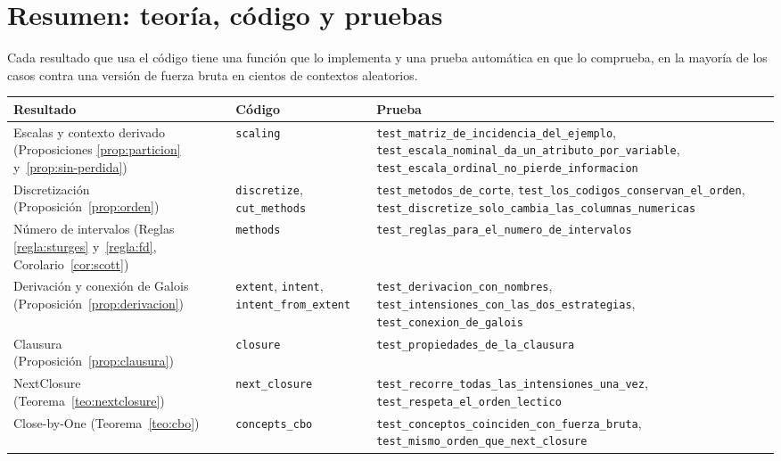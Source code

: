 \section{Resumen: teoría, código y pruebas}
\label{sec:resumen-general}

Cada resultado que usa el código tiene una función que lo implementa y una prueba automática en  que lo comprueba, en la mayoría de los casos contra una versión de fuerza bruta en cientos de contextos aleatorios.

\begingroup
\footnotesize
\begin{longtable}{@{}>{\raggedright\arraybackslash}p{4.2cm} >{\raggedright\arraybackslash}p{3.4cm} >{\raggedright\arraybackslash}p{8.1cm}@{}}
  \toprule
  Resultado & Código & Prueba \\
  \midrule
  \endhead
  Escalas y contexto derivado (Proposiciones \ref{prop:particion} y~\ref{prop:sin-perdida}) & \texttt{scaling} & \texttt{test\_matriz\_de\_incidencia\_del\_ejemplo}, \texttt{test\_escala\_nominal\_da\_un\_\allowbreak atributo\_por\_variable}, \texttt{test\_escala\_ordinal\_no\_pierde\_informacion} \\
  Discretización (Proposición~\ref{prop:orden}) & \texttt{discretize}, \texttt{cut\_methods} & \texttt{test\_metodos\_de\_corte}, \texttt{test\_los\_codigos\_conservan\_el\_orden}, \texttt{test\_discretize\_solo\_cambia\_\allowbreak las\_columnas\_numericas} \\
  Número de intervalos (Reglas \ref{regla:sturges} y~\ref{regla:fd}, Corolario~\ref{cor:scott}) & \texttt{methods} & \texttt{test\_reglas\_para\_el\_numero\_de\_intervalos} \\
  Derivación y conexión de Galois (Proposición~\ref{prop:derivacion}) & \texttt{extent}, \texttt{intent}, \texttt{intent\_from\_extent} & \texttt{test\_derivacion\_con\_nombres}, \texttt{test\_intensiones\_con\_las\_dos\_estrategias}, \texttt{test\_conexion\_de\_galois} \\
  Clausura (Proposición~\ref{prop:clausura}) & \texttt{closure} & \texttt{test\_propiedades\_de\_la\_clausura} \\
  NextClosure (Teorema~\ref{teo:nextclosure}) & \texttt{next\_closure} & \texttt{test\_recorre\_todas\_las\_intensiones\_una\_vez}, \texttt{test\_respeta\_el\_orden\_lectico} \\
  Close-by-One (Teorema~\ref{teo:cbo}) & \texttt{concepts\_cbo} & \texttt{test\_conceptos\_coinciden\_con\_fuerza\_bruta}, \texttt{test\_mismo\_orden\_que\_next\_closure} \\

\end{longtable}
